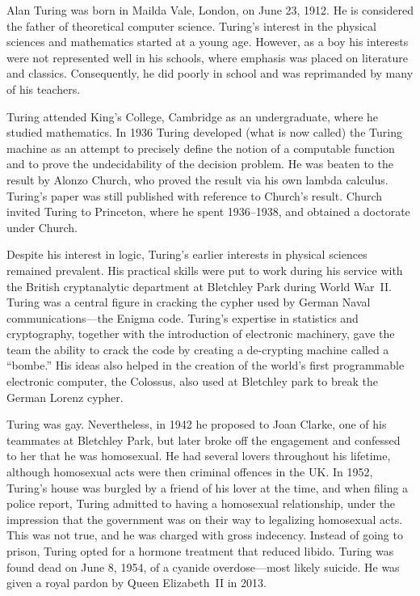 \documentclass[../../../include/open-logic-section]{subfiles}
\begin{document}



Alan Turing was born in Mailda Vale, London, on June 23, 1912. He is
considered the father of theoretical computer science. Turing's
interest in the physical sciences and mathematics started at a young
age. However, as a boy his interests were not represented well in his
schools, where emphasis was placed on literature and
classics. Consequently, he did poorly in school and was reprimanded by
many of his teachers.

Turing attended King's College, Cambridge as an undergraduate, where
he studied mathematics. In 1936 Turing developed (what is now called)
the Turing machine as an attempt to precisely define the notion of a
computable function and to prove the undecidability of the decision
problem. He was beaten to the result by Alonzo Church, who proved the
result via his own lambda calculus. Turing's paper was still published
with reference to Church's result. Church invited Turing to Princeton,
where he spent 1936--1938, and obtained a doctorate under Church.

Despite his interest in logic, Turing's earlier interests in physical
sciences remained prevalent. His practical skills were put to work
during his service with the British cryptanalytic department at
Bletchley Park during World War~II. Turing was a central figure in
cracking the cypher used by German Naval communications---the Enigma
code.  Turing's expertise in statistics and cryptography, together
with the introduction of electronic machinery, gave the team the
ability to crack the code by creating a de-crypting machine called a
``bombe.'' His ideas also helped in the creation of the world's first
programmable electronic computer, the Colossus, also used at Bletchley
park to break the German Lorenz cypher.

Turing was gay. Nevertheless, in 1942 he proposed to Joan Clarke, one
of his teammates at Bletchley Park, but later broke off the engagement
and confessed to her that he was homosexual. He had several lovers
throughout his lifetime, although homosexual acts were then criminal
offences in the UK. In 1952, Turing's house was burgled by a friend of
his lover at the time, and when filing a police report, Turing
admitted to having a homosexual relationship, under the impression
that the government was on their way to legalizing homosexual
acts. This was not true, and he was charged with gross
indecency. Instead of going to prison, Turing opted for a hormone
treatment that reduced libido.  Turing was found dead on June 8, 1954,
of a cyanide overdose---most likely suicide. He was given a royal
pardon by Queen Elizabeth~II in 2013.
\end{document}
